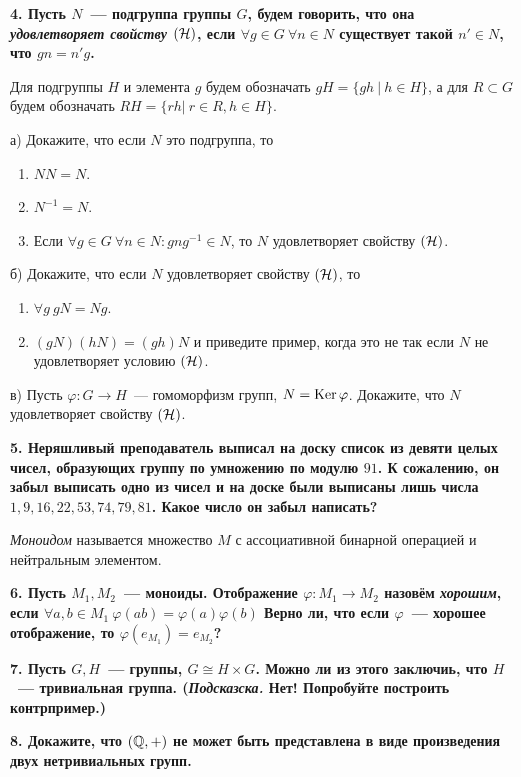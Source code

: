 \documentclass[10pt]{article}
\begin{document}
\begin{landscape}
\begin{multicols}{2}
	 \bf{4.}  Пусть $N$~--- подгруппа группы $G$, будем говорить, что она \emph{удовлетворяет свойству $(\mathcal{H})$}, если $\forall g \in G \ \forall n \in N$ существует такой $n' \in N$, что $gn = n'g$.

	Для подгруппы $H$ и элемента $g$ будем обозначать $g H = \{ gh \ \vert \ h \in H \}$, а для $R \subset G$ будем обозначать $RH = \{ r h \vert \ r \in R, h \in H \}$.

	а) Докажите, что если $N$ это подгруппа, то
	\vspace{-2mm}
	\begin{enumerate}
		\item $NN = N$. 
		\item $N^{-1} = N$. 
		\item Если $\forall g\in G\  \forall n \in N\colon g n g^{-1} \in N$, то $N$ удовлетворяет свойству $(\mathcal{H})$.
	\end{enumerate}

	б) Докажите, что если $N$ удовлетворяет свойству $(\mathcal{H})$, то
	\vspace{-2mm}
	\begin{enumerate}
		\item $\forall g \ gN = Ng$.
		\item $(gN)(hN) = (gh)N$ и приведите пример, когда это не так если $N$ не удовлетворяет условию $(\mathcal{H})$. 
	\end{enumerate}

	в) Пусть $\varphi \colon G \to H$~--- гомоморфизм групп, $N = \operatorname{Ker}{\varphi}$. Докажите, что $N$ удовлетворяет свойству $(\mathcal{H})$.

	\bf{5.} Неряшливый преподаватель выписал на доску список из девяти целых чисел, образующих группу по умножению по модулю $91$. К сожалению, он забыл выписать одно из чисел и на доске были выписаны лишь числа $1, 9, 16, 22, 53, 74, 79, 81$. Какое число он забыл написать? 

	\begin{definition} 
		\emph{Моноидом} называется множество $M$ с ассоциативной бинарной операцией и нейтральным элементом.   
	\end{definition}

	\bf{6.} Пусть $M_1, M_2$~--- моноиды. Отображение $\varphi \colon M_1 \to M_2$ назовём \emph{хорошим}, если $\forall a, b \in M_1 \ \varphi(ab) = \varphi(a) \varphi(b)$
	  Верно ли, что если $\varphi$~--- хорошее отображение, то $\varphi(e_{M_1}) = e_{M_2}$?

	 \bf{7.}  Пусть $G, H$~--- группы,  $G \cong H \times G$. Можно ли из этого заключиь, что $H$~--- тривиальная группа. (\emph{Подсказска.} Нет! Попробуйте построить контрпример.)

	 \bf{8.} Докажите, что $(\mathbb{Q}, +)$ не может быть представлена в виде произведения двух нетривиальных групп. 
	

	\end{multicols}
	\end{landscape}
\end{document}

